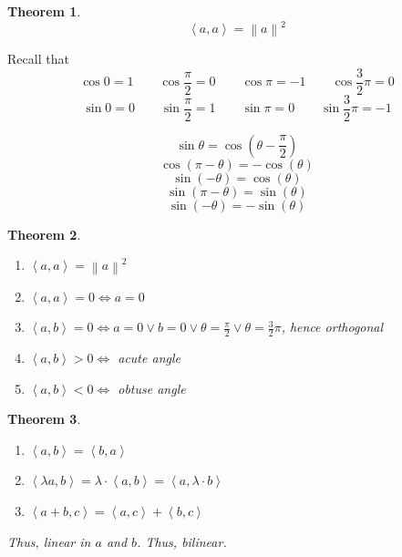 \documentclass{article}
\newtheorem{theorem}{Theorem}  \numberwithin{theorem}{section}
\newcommand{\angel}[1]{\left\langle#1\right\rangle}
\newcommand{\norm}[1]{\left\|#1\right\|}
\begin{document}
\begin{theorem}
  \[ \angel{a,a} = \norm{a}^2 \]
\end{theorem}

Recall that
\[ \cos{0} = 1 \qquad \cos{\frac\pi2} = 0 \qquad \cos{\pi} = -1 \qquad \cos{\frac32 \pi} = 0 \]
\[ \sin{0} = 0 \qquad \sin{\frac\pi2} = 1 \qquad \sin{\pi} = 0 \qquad \sin{\frac32 \pi} = -1 \]

\[ \sin\theta = \cos(\theta - \frac\pi2) \]
\[ \cos(\pi - \theta) = -\cos(\theta) \]
\[ \sin(-\theta) = \cos(\theta) \]
\[ \sin(\pi - \theta) = \sin(\theta) \]
\[ \sin(-\theta) = -\sin(\theta) \]

\begin{theorem} %
  \begin{enumerate}
    \item $\angel{a,a} = \norm{a}^2$
    \item $\angel{a,a} = 0 \iff a = 0$
    \item $\angel{a,b} = 0 \iff a = 0 \lor b = 0 \lor \theta = \frac\pi2 \lor \theta = \frac32 \pi$, hence orthogonal
    \item $\angel{a,b} > 0 \iff$ acute angle
    \item $\angel{a,b} < 0 \iff$ obtuse angle
  \end{enumerate}
\end{theorem}

\begin{theorem} %
  \label{satz83}
  \begin{enumerate}
    \item $\angel{a,b} = \angel{b,a}$
    \item $\angel{\lambda a, b} = \lambda \cdot \angel{a, b} = \angel{a, \lambda \cdot b}$
    \item $\angel{a+b, c} = \angel{a,c} + \angel{b, c}$
  \end{enumerate}
  Thus, linear in $a$ and $b$. Thus, bilinear.
\end{theorem}
\end{document}
